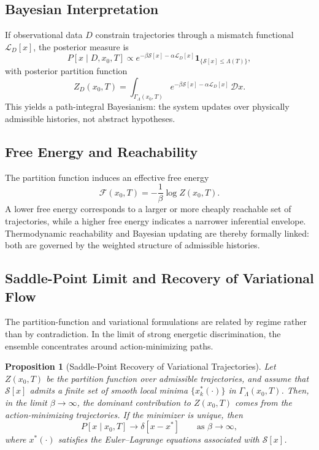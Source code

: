 \documentclass[12pt]{article}
\theoremstyle{plain}
\newtheorem{proposition}[theorem]{Proposition}
\theoremstyle{definition}
\theoremstyle{remark}
\begin{document}
\subsection{Bayesian Interpretation}

If observational data $D$ constrain trajectories through a mismatch functional $\mathcal{L}_D[x]$, the posterior measure is
\[
P[x \mid D, x_0,T] \propto e^{-\beta \mathcal{S}[x] - \alpha \mathcal{L}_D[x]} \mathbf{1}_{\{\mathcal{S}[x]\leq \Lambda(T)\}},
\]
with posterior partition function
\[
Z_D(x_0,T) = \int_{\Gamma_{\Lambda}(x_0,T)} e^{-\beta \mathcal{S}[x] - \alpha \mathcal{L}_D[x]} \,\mathcal{D}x.
\]
This yields a path-integral Bayesianism: the system updates over physically admissible histories, not abstract hypotheses.

\subsection{Free Energy and Reachability}

The partition function induces an effective free energy
\[
\mathcal{F}(x_0,T) = -\frac{1}{\beta}\log Z(x_0,T).
\]
A lower free energy corresponds to a larger or more cheaply reachable set of trajectories, while a higher free energy indicates a narrower inferential envelope. Thermodynamic reachability and Bayesian updating are thereby formally linked: both are governed by the weighted structure of admissible histories.

\subsection{Saddle-Point Limit and Recovery of Variational Flow}

The partition-function and variational formulations are related by regime rather than by contradiction. In the limit of strong energetic discrimination, the ensemble concentrates around action-minimizing paths.

\begin{proposition}[Saddle-Point Recovery of Variational Trajectories]
Let $Z(x_0,T)$ be the partition function over admissible trajectories, and assume that $\mathcal{S}[x]$ admits a finite set of smooth local minima $\{x^\ast_k(\cdot)\}$ in $\Gamma_{\Lambda}(x_0,T)$. Then, in the limit $\beta \to \infty$, the dominant contribution to $Z(x_0,T)$ comes from the action-minimizing trajectories. If the minimizer is unique, then
\[
P[x \mid x_0,T] \to \delta[x-x^\ast] \qquad \text{as } \beta \to \infty,
\]
where $x^\ast(\cdot)$ satisfies the Euler--Lagrange equations associated with $\mathcal{S}[x]$.
\end{proposition}
\end{document}
